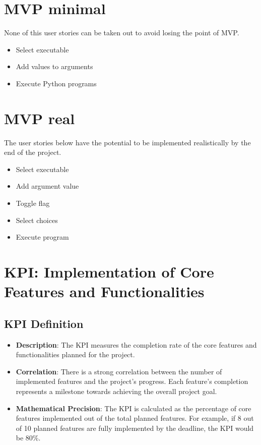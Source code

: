 \documentclass{article}
\begin{document}
\section{MVP minimal}
None of this user stories can be taken out to avoid losing the point of MVP.
\begin{itemize}
    \item Select executable
    \item Add values to arguments
    \item Execute Python programs
\end{itemize}

\section{MVP real}
The user stories below have the potential to be implemented realistically by the end of the project.
\begin{itemize}
    \item Select executable
    \item Add argument value
    \item Toggle flag
    \item Select choices
    \item Execute program
\end{itemize}

\section{KPI: Implementation of Core Features and Functionalities}

\subsection{KPI Definition}

\begin{itemize}
    \item \textbf{Description}: The KPI measures the completion rate of the core features and functionalities planned for the project.
    \item \textbf{Correlation}: There is a strong correlation between the number of implemented features and the project's progress. Each feature's completion represents a milestone towards achieving the overall project goal.
    \item \textbf{Mathematical Precision}: The KPI is calculated as the percentage of core features implemented out of the total planned features. For example, if 8 out of 10 planned features are fully implemented by the deadline, the KPI would be 80\%.
\end{itemize}
\end{document}
